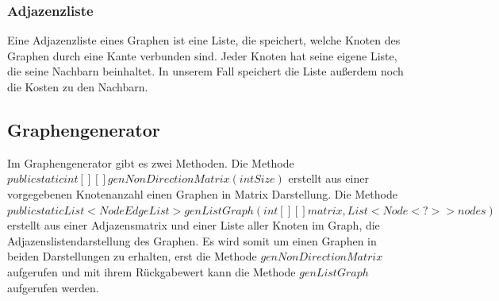 \documentclass[
   draft=false
  ,paper=a4
  ,twoside=false
  ,fontsize=11pt
  ,headsepline
  ,DIV11
  ,parskip=full+
]{scrartcl} %
\begin{document}
\subsubsection{Adjazenzliste}
Eine Adjazenzliste eines Graphen ist eine Liste, die speichert, welche Knoten des Graphen durch eine Kante verbunden sind.
Jeder Knoten hat seine eigene Liste, die seine Nachbarn beinhaltet.
In unserem Fall speichert die Liste außerdem noch die Kosten zu den Nachbarn.


\subsection{Graphengenerator}
Im Graphengenerator gibt es zwei Methoden. 
Die Methode $public static int[][] genNonDirectionMatrix(int Size)$ erstellt aus einer vorgegebenen Knotenanzahl einen Graphen in Matrix Darstellung.
Die Methode $public static List<NodeEdgeList> genListGraph(int[][] matrix, List<Node<?>> nodes)$ erstellt aus einer Adjazensmatrix und einer Liste aller Knoten im Graph, die Adjazenslistendarstellung des Graphen.
Es wird somit um einen Graphen in beiden Darstellungen zu erhalten, erst die Methode $genNonDirectionMatrix$ aufgerufen und mit ihrem Rückgabewert kann die Methode $genListGraph$ aufgerufen werden.
\end{document}
